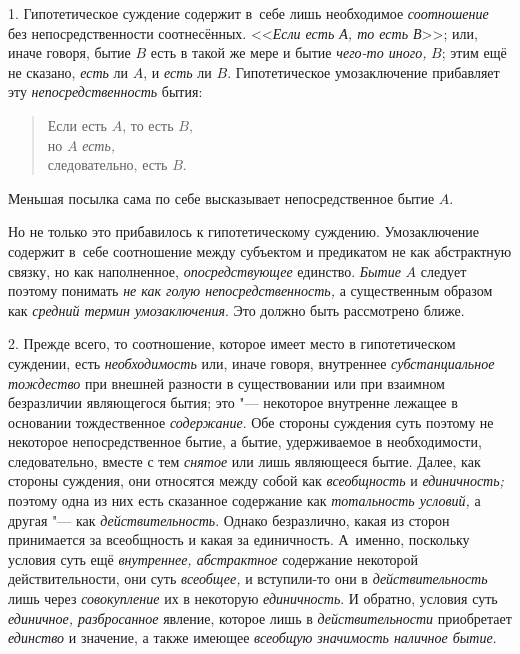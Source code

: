 1. Гипотетическое суждение содержит в~себе лишь необходимое
{\em соотношение} без непосредственности соотнесённых.
<<{\em Если есть А, то есть В}>>; или, иначе говоря, бытие $B$ есть в такой же
мере и бытие {\em чего-то иного,} $B$; этим ещё не сказано, {\em есть} ли
$A$, и {\em есть} ли $B$. Гипотетическое умозаключение прибавляет эту
{\em непосредственность} бытия:

\begin{verse}
Если есть $A$, то есть $B$,\\
но $A$ {\em есть,}\\
следовательно, есть $B$.
\end{verse}

Меньшая посылка сама по себе высказывает непосредственное бытие $A$.

Но не только это прибавилось к гипотетическому суждению.
Умозаключение содержит в~себе соотношение между субъектом и предикатом не
как абстрактную связку, но как наполненное, {\em опосредствующее}
единство. {\em Бытие} $A$ следует поэтому понимать
{\em не как голую непосредственность,} а существенным образом как
{\em средний термин умозаключения}. Это должно быть рассмотрено ближе.

2. Прежде всего, то соотношение, которое имеет место в
гипотетическом суждении, есть {\em необходимость} или,
иначе говоря, внутреннее {\em субстанциальное тождество}
при внешней разности в существовании или при
взаимном безразличии являющегося бытия; это "--- некоторое
внутренне лежащее в основании тождественное {\em содержание}. Обе
стороны суждения суть поэтому не некоторое непосредственное бытие, а бытие,
удерживаемое в необходимости, следовательно, вместе с тем {\em снятое} или лишь
являющееся бытие. Далее, как стороны суждения, они относятся между собой
как {\em всеобщность} и {\em единичность;}
поэтому одна из них есть сказанное содержание как
{\em тотальность условий,} а другая "--- как {\em действительность}.
Однако безразлично, какая из сторон принимается за
всеобщность и какая за единичность. А~именно, поскольку условия суть ещё
{\em внутреннее, абстрактное}
содержание некоторой действительности, они суть
{\em всеобщее,} и вступили-то они в {\em действительность}
лишь через {\em совокупление} их в некоторую {\em единичность}.
И обратно, условия суть {\em единичное, разбросанное}
явление, которое лишь в {\em действительности} приобретает {\em единство} и
значение, а также имеющее {\em всеобщую значимость наличное бытие}.


